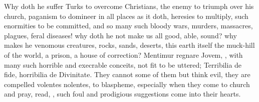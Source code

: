 {Why doth he suffer Turks to overcome Christians, the enemy to triumph
over his church, paganism to domineer in all places as it doth,
heresies to multiply, such enormities to be committed, and so many such
bloody wars, murders, massacres, plagues, feral diseases! why doth he
not make us all good, able, sound? why makes he venomous
creatures, rocks, sands, deserts, this earth itself the muck-hill of
the world, a prison, a house of correction? Mentimur regnare
Jovem, \etc{}, with many such horrible and execrable conceits, not fit to
be uttered; Terribilia de fide, horribilia de Divinitate. They cannot
some of them but think evil, they are compelled volentes nolentes, to
blaspheme, especially when they come to church and pray, read, \etc{},
such foul and prodigious suggestions come into their hearts.

}
